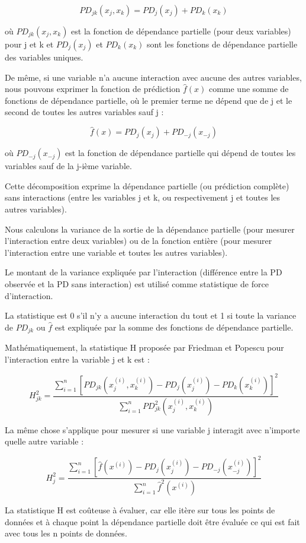 \[
PD_{jk}(x_j,x_k) = PD_j(x_j) + PD_k(x_k)
\]

où \(PD_{jk}(x_j,x_k)\) est la fonction de dépendance partielle (pour deux variables) pour j et k et \(PD_j(x_j)\) et \(PD_k(x_k)\) sont les fonctions de dépendance partielle des variables uniques.

De même, si une variable n'a aucune interaction avec aucune des autres variables, nous pouvons exprimer la fonction de prédiction \(\hat{f}(x)\) comme une somme de fonctions de dépendance partielle, où le premier terme ne dépend que de j et le second de toutes les autres variables sauf j :

\[
\hat{f}(x) = PD_j(x_j) + PD_{-j}(x_{-j})
\]

où \(PD_{-j}(x_{-j})\) est la fonction de dépendance partielle qui dépend de toutes les variables sauf de la j-ième variable.

Cette décomposition exprime la dépendance partielle (ou prédiction complète) sans interactions (entre les variables j et k, ou respectivement j et toutes les autres variables).

Nous calculons la variance de la sortie de la dépendance partielle (pour mesurer l'interaction entre deux variables) ou de la fonction entière (pour mesurer l'interaction entre une variable et toutes les autres variables).

Le montant de la variance expliquée par l'interaction (différence entre la PD observée et la PD sans interaction) est utilisé comme statistique de force d'interaction.

La statistique est 0 s'il n'y a aucune interaction du tout et 1 si toute la variance de \(PD_{jk}\) ou \(\hat{f}\) est expliquée par la somme des fonctions de dépendance partielle.

Mathématiquement, la statistique H proposée par Friedman et Popescu pour l'interaction entre la variable j et k est :

\[
H^2_{jk} = \frac{\sum_{i=1}^n\left[PD_{jk}(x_{j}^{(i)},x_k^{(i)}) - PD_j(x_j^{(i)}) - PD_k(x_{k}^{(i)})\right]^2}{\sum_{i=1}^n{PD^2_{jk}(x_j^{(i)},x_k^{(i)})}}
\]

La même chose s'applique pour mesurer si une variable j interagit avec n'importe quelle autre variable :

\[
H^2_{j} = \frac{\sum_{i=1}^n\left[\hat{f}(x^{(i)}) - PD_j(x_j^{(i)}) - PD_{-j}(x_{-j}^{(i)})\right]^2}{\sum_{i=1}^n\hat{f}^2(x^{(i)})}
\]

La statistique H est coûteuse à évaluer, car elle itère sur tous les points de données et à chaque point la dépendance partielle doit être évaluée ce qui est fait avec tous les n points de données.

